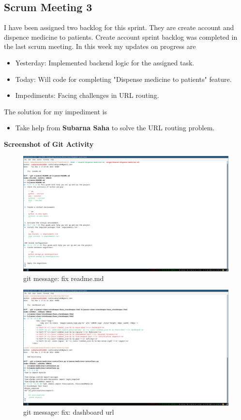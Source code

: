 \documentclass[a4paper,12pt]{article}
\begin{document}
\subsection{Scrum Meeting 3}
I have been assigned two backlog for this sprint. They are create account and dispence medicine to patients.
Create account sprint backlog was completed in the last scrum meeting. In this week my updates on progress are
\begin{itemize}
    \item Yesterday: Implemented backend logic for the assigned task.
    \item Today: Will code for completing "Dispense medicine to patients" feature.
    \item Impediments: Facing challenges in URL routing.
\end{itemize}
The solution for my impediment is
\begin{itemize}
    \item Take help from \textbf{Subarna Saha} to solve the URL routing problem.
\end{itemize}
\textbf{\large{Screenshot of Git Activity}}
\begin{figure}[H]
    \centering
    \includegraphics[width=\textwidth]{spr1meet31.png}
    \caption{git message: fix readme.md}
\end{figure}
\begin{figure}[H]
    \centering
    \includegraphics[width=\textwidth]{spr1meet32.png}
    \caption{git message: fix: dashboard url}
\end{figure}
\end{document}
